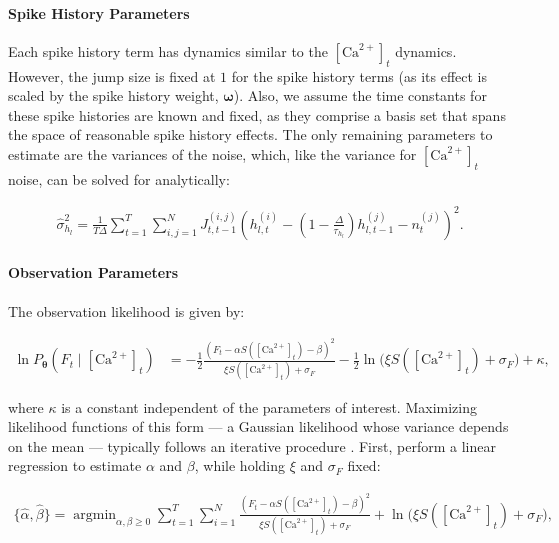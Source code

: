 \documentclass[10pt]{article}
\providecommand{\ve}[1]{\boldsymbol{#1}}
\providecommand{\ve}[1]{\boldsymbol{#1}}
\DeclareMathOperator*{\argmin}{argmin}
\newcommand{\thetn}{\ve{\theta}}
\newcommand{\p}{P_{\thetn}}
\newcommand{\Ca}{[\text{Ca}^{2+}]}
\begin{document}
\paragraph{Spike History Parameters}

Each spike history term has dynamics similar to the $\Ca_t$ dynamics. However, the jump size is fixed at $1$ for the spike history terms (as its effect is scaled by the spike history weight, $\ve{\omega}$). Also, we assume the time constants for these spike histories are known and fixed, as they comprise a basis set that spans the space of reasonable spike history effects.  The only remaining parameters to estimate are the variances of the noise, which, like the variance for $\Ca_t$ noise, can be solved for analytically:

\begin{align}
\widehat{\sigma}_{h_l}^2 = \frac{1}{T \Delta} \sum_{t=1}^T \sum_{i,j=1}^N J^{(i,j)}_{t,t-1} \left(h_{l,t}^{(i)} - (1 - \frac{\Delta}{\tau_{h_l}}) h_{l,t-1}^{(j)} -  n_t^{(j)}\right)^2.
\end{align}


\paragraph{Observation Parameters}

The observation likelihood is given by:

\begin{align} \label{eq:obs_lik2}
\ln \p(F_t \mid \Ca_t) &= -\frac{1}{2} \frac{(F_t-\alpha S(\Ca_t) - \beta)^2}{\xi S(\Ca_t) + \sigma_F} -\frac{1}{2} \ln \big(\xi S(\Ca_t) + \sigma_F) + \kappa,
\end{align}

\noindent where $\kappa$ is a constant independent of the parameters of interest. Maximizing likelihood functions of this form --- a Gaussian likelihood whose variance depends on the mean --- typically follows an iterative procedure  \cite{ShumwayStoffer06}.  First, perform a linear regression to estimate $\alpha$ and $\beta$, while holding $\xi$ and $\sigma_F$ fixed:

\begin{align} \label{eq:ab}
\{\widehat{\alpha}, \widehat{\beta}\} = \argmin_{\alpha, \beta \geq 0} \sum_{t=1}^T \sum_{i=1}^N  \frac{(F_t-\alpha S(\Ca_t) - \beta)^2}{\xi S(\Ca_t) + \sigma_F} + \ln\big(\xi S(\Ca_t) + \sigma_F\big),
\end{align}
\end{document}
